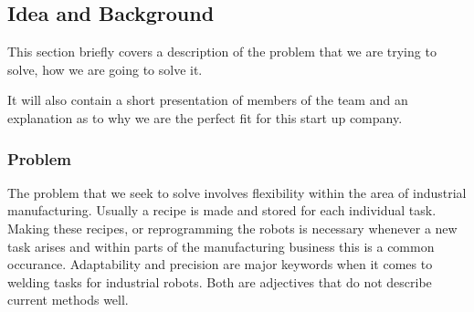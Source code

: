 



\subsection{Idea and Background}
This section briefly covers a description of the problem that we are trying to solve, how we are going to solve it.

It will also contain a short presentation of members of the team and an explanation as to why we are the perfect fit for this start up company.

\subsubsection{Problem}
The problem that we seek to solve involves flexibility within the area of industrial manufacturing. Usually a recipe is made and stored for each individual task.
Making these recipes, or reprogramming the robots is necessary whenever a new task arises and within parts of the manufacturing business this is a common occurance. 
Adaptability and precision are major keywords when it comes to welding tasks for industrial robots. Both are adjectives that do not describe current methods well.

